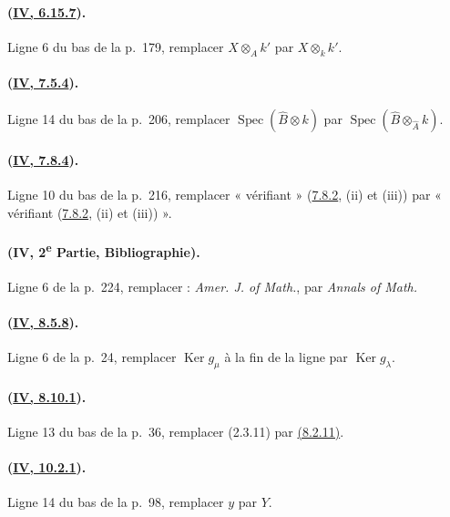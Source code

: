 \paragraph{({\texorpdfstring{\protect\hyperlink{ega4.c04.prop.6-15-7}{IV, 6.15.7}}{IV, 6.15.7}}).}
Ligne 6 du bas de la p.~179, remplacer $X\otimes_Ak'$ par
$X\otimes_kk'$.

\paragraph{({\texorpdfstring{\protect\hyperlink{ega4.c04.item.7-5-4}{IV, 7.5.4}}{IV, 7.5.4}}).}
Ligne 14 du bas de la p.~206, remplacer
$\operatorname{Spec}(\widehat B\otimes k)$ par
$\operatorname{Spec}(\widehat B\otimes_{\widehat A}k)$.

\paragraph{({\texorpdfstring{\protect\hyperlink{ega4.c04.item.7-8-4}{IV, 7.8.4}}{IV, 7.8.4}}).}
Ligne 10 du bas de la p.~216, remplacer « vérifiant »
({\hyperlink{ega4.c04.def.7-8-2}{7.8.2}}, (ii) et (iii)) par
« vérifiant ({\hyperlink{ega4.c04.def.7-8-2}{7.8.2}}, (ii) et (iii)) ».

\paragraph{(IV, 2\textsuperscript{e} Partie, Bibliographie).}
Ligne 6 de la p.~224, remplacer : \emph{Amer. J. of Math.}, par
\emph{Annals of Math.}

\paragraph{({\texorpdfstring{\protect\hyperlink{ega4.c04.cor.8-5-8}{IV, 8.5.8}}{IV, 8.5.8}}).}
Ligne 6 de la p.~24, remplacer $\operatorname{Ker}g_\mu$ à la fin de
la ligne par $\operatorname{Ker}g_\lambda$.

\paragraph{({\texorpdfstring{\protect\hyperlink{ega4.c04.prop.8-10-1}{IV, 8.10.1}}{IV, 8.10.1}}).}
Ligne 13 du bas de la p.~36, remplacer (2.3.11) par
{\hyperlink{ega4.c04.cor.8-2-11}{(8.2.11)}}.

\paragraph{({\texorpdfstring{\protect\hyperlink{ega4.c04.prop.10-2-1}{IV, 10.2.1}}{IV, 10.2.1}}).}
Ligne 14 du bas de la p.~98, remplacer $y$ par $Y$.

